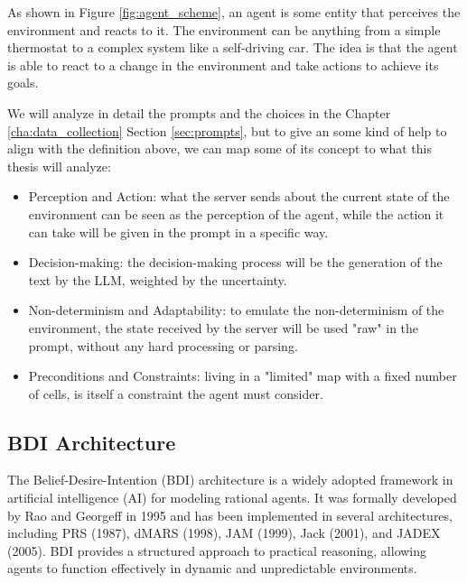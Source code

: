 As shown in Figure \ref{fig:agent_scheme}, an agent is some entity that perceives
the environment and reacts to it. The environment can be anything from a simple
thermostat to a complex system like a self-driving car. The idea is that the agent
is able to react to a change in the environment and take actions to achieve its goals.

We will analyze in detail the prompts and the choices in the Chapter \ref{cha:data_collection}
Section \ref{sec:prompts}, but to give an some kind of help to align with the
definition above, we can map some of its concept to what this thesis will analyze:
\begin{itemize}
  \item Perception and Action: what the server sends about the current state of
    the environment can be seen as the perception of the agent, while the action
    it can take will be given in the prompt in a specific way.

  \item Decision-making: the decision-making process will be the generation of
    the text by the LLM, weighted by the uncertainty.

  \item Non-determinism and Adaptability: to emulate the non-determinism of the
    environment, the state received by the server will be used "raw" in the prompt,
    without any hard processing or parsing.

  \item Preconditions and Constraints: living in a "limited" map with a fixed
    number of cells, is itself a constraint the agent must consider.
\end{itemize}

\subsection{BDI Architecture}
\label{sub:bdi_architecture}

The Belief-Desire-Intention (BDI) architecture is a widely adopted framework in
artificial intelligence (AI) for modeling rational agents. It was formally developed
by Rao and Georgeff in 1995 \cite{bdi-icmas95} and has been implemented in several
architectures, including PRS (1987), dMARS (1998), JAM (1999), Jack (2001), and
JADEX (2005). BDI provides a structured approach to practical reasoning,
allowing agents to function effectively in dynamic and unpredictable
environments.

